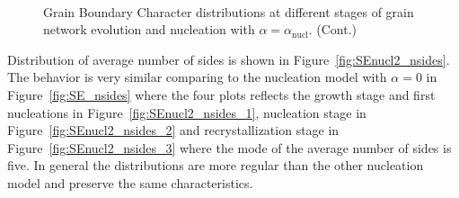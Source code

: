 \begin{figure}[ht]\ContinuedFloat
    \centering
    \\
    \caption{Grain Boundary Character distributions at different stages of grain network evolution and nucleation with $\alpha = \alpha_{\text{nucl}}$. (Cont.)}
    \label{fig:SEnucl2_gbcd}
\end{figure}

Distribution of average number of sides is shown in Figure~\ref{fig:SEnucl2_nsides}. 
The behavior is very similar comparing to the nucleation model with $\alpha = 0$ in Figure~\ref{fig:SE_nsides} where the four plots reflects the growth stage and first nucleations in Figure~\ref{fig:SEnucl2_nsides_1}, nucleation stage in Figure~\ref{fig:SEnucl2_nsides_2} and recrystallization stage in Figure~\ref{fig:SEnucl2_nsides_3} where the mode of the average number of sides is five. In general the distributions are more regular than the other nucleation model and preserve the same characteristics.

